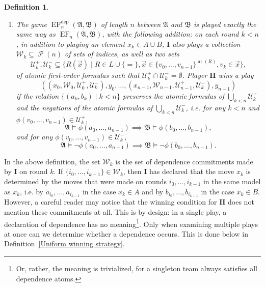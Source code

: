 \documentclass[10pt,a4paper]{amsart}
\newtheorem{definition}{Definition}[section]
\newcommand{\wins}{\mathbin{\raisebox{0.8\depth}{$\uparrow$}}}
\newcommand{\playerone}{\mathrm{\mathbf{I}}}
\newcommand{\playertwo}{\mathrm{\mathbf{II}}}
\DeclareMathOperator{\EF}{EF}
\newcommand{\EFdep}{\EF^{\mathrm{dep}}}
\newcommand{\W}{\mathcal W}
\newcommand{\U}{\mathcal U}
\newcommand{\A}{\mathfrak{A}}
\newcommand{\B}{\mathfrak{B}}
\DeclareMathOperator{\ar}{ar}
\DeclareMathOperator{\Pow}{\mathcal{P}}
\begin{document}
\begin{definition}
\begin{enumerate}
        If a player $P$ has a winning strategy in the game, we write
        \[
            P\wins\EF_n(\A,\B).
        \]
        \item The game $\EFdep_n(\A,\B)$ of length $n$ between $\A$ and $\B$ is played exactly the same way as $\EF_n(\A,\B)$, with the following addition: on each round $k<n$, in addition to playing an element $x_k\in A\cup B$, $\playerone$ also plays a collection $\W_k\subseteq\Pow(n)$ of sets of indices, as well as two sets
        \[
            \U^+_k,\U^-_k \subseteq \{ R(\vec x) \mid R\in L\cup\{=\}, \vec x\in\{v_0,\dots,v_{n-1}\}^{\ar(R)}, v_k\in\vec x \},
        \]
        of atomic first-order formulas such that $\U^+_k\cap\U^-_k = \emptyset$.
        Player $\playertwo$ wins a play
        \[
            ((x_0,\W_0,\U^+_0,\U^-_k),y_0,\dots,(x_{n-1},\W_{n-1},\U^+_{n-1},\U^-_k),y_{n-1})
        \]
        if the relation $\{ (a_k, b_k) \mid k<n \}$ preserves the atomic formulas of $\bigcup_{k<n}\U^+_k$ and the negations of the atomic formulas of $\bigcup_{k<n}\U^-_k$, i.e. for any $k<n$ and $\phi(v_0,\dots,v_{n-1})\in\U^+_k$,
        \[
            \A\models\phi(a_0,\dots,a_{n-1}) \implies \B\models\phi(b_0,\dots,b_{n-1}),
        \]
        and for any $\phi(v_0,\dots,v_{n-1})\in\U^-_k$,
        \[
            \A\models\neg\phi(a_0,\dots,a_{n-1}) \implies \B\models\neg\phi(b_0,\dots,b_{n-1}).
        \]
    \end{enumerate}
\end{definition}

In the above definition, the set $\W_k$ is the set of dependence commitments made by $\playerone$ on round $k$. If $\{i_0,\dots,i_{k-1}\}\in\W_k$, then $\playerone$ has declared that the move $x_k$ is determined by the moves that were made on rounds $i_0,\dots,i_{k-1}$ in the same model as $x_k$, i.e. by $a_{i_0},\dots,a_{i_{k-1}}$ in the case $x_k\in A$ and by $b_{i_0},\dots,b_{i_{k-1}}$ in the case $x_k\in B$. However, a careful reader may notice that the winning condition for $\playertwo$ does not mention these commitments at all. This is by design: in a single play, a declaration of dependence has no meaning\footnote{Or, rather, the meaning is trivialized, for a singleton team always satisfies all dependence atoms.}. Only when examining multiple plays at once can we determine whether a dependence occurs. This is done below in Definition~\ref{Uniform winning strategy}.
\end{document}
